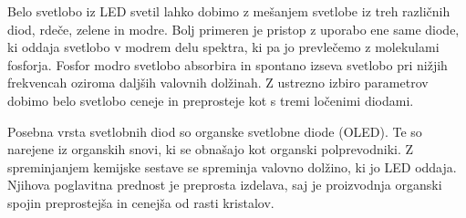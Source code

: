 Belo svetlobo iz LED svetil lahko dobimo z mešanjem svetlobe iz treh različnih 
diod, rdeče, zelene in modre. Bolj primeren je pristop z uporabo ene same diode, 
ki oddaja svetlobo v modrem delu spektra, ki pa jo prevlečemo z molekulami fosforja. 
Fosfor modro svetlobo absorbira in spontano izseva svetlobo pri nižjih frekvencah 
oziroma daljših valovnih dolžinah. Z ustrezno izbiro parametrov dobimo belo svetlobo
ceneje in preprosteje kot s tremi ločenimi diodami. 

\begin{remark}
Posebna vrsta svetlobnih diod so organske svetlobne diode (OLED). Te so narejene iz
organskih snovi, ki se obnašajo kot organski polprevodniki. Z spreminjanjem kemijske
sestave se spreminja valovno dolžino, ki jo LED oddaja. Njihova poglavitna prednost
je preprosta izdelava, saj je proizvodnja organski spojin preprostejša in cenejša
od rasti kristalov. 
\end{remark}
